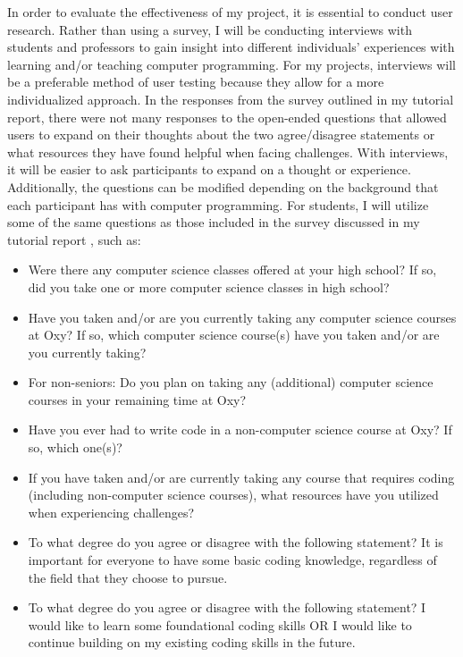 \documentclass[10pt,twocolumn]{article}
\begin{document}
In order to evaluate the effectiveness of my project, it is essential to conduct user research. Rather than using a survey, I will be conducting interviews with students and professors to gain insight into different individuals' experiences with learning and/or teaching computer programming. For my projects, interviews will be a preferable method of user testing because they allow for a more individualized approach. In the responses from the survey outlined in my tutorial report, there were not many responses to the open-ended questions that allowed users to expand on their thoughts about the two agree/disagree statements or what resources they have found helpful when facing challenges. With interviews, it will be easier to ask participants to expand on a thought or experience. Additionally, the questions can be modified depending on the background that each participant has with computer programming. For students, I will utilize some of the same questions as those included in the survey discussed in my tutorial report \cite{Tutorial}, such as:
\begin{itemize}
    \item Were there any computer science classes offered at your high school? If so, did you take one or more computer science classes in high school?
    \item{Have you taken and/or are you currently taking any computer science courses at Oxy? If so, which computer science course(s) have you taken and/or are you currently taking?}
    \item{For non-seniors: Do you plan on taking any (additional) computer science courses in your remaining time at Oxy?}
    \item{Have you ever had to write code in a non-computer science course at Oxy? If so, which one(s)?}
    \item{If you have taken and/or are currently taking any course that requires coding (including non-computer science courses), what resources have you utilized when experiencing challenges?}
    \item{To what degree do you agree or disagree with the following statement? It is important for everyone to have some basic coding knowledge, regardless of the field that they choose to pursue.}
    \item{To what degree do you agree or disagree with the following statement? I would like to learn some foundational coding skills OR I would like to continue building on my existing coding skills in the future.}
\end{itemize}
\end{document}
